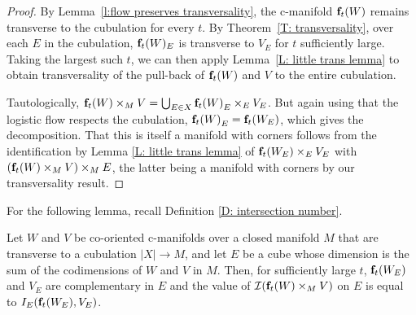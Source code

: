 \begin{proof}
	By Lemma~\ref{l:flow preserves transversality}, the c-manifold $\mathbf{f}_t(W)$ remains transverse to the cubulation for every $t$.
	By Theorem~\ref{T: transversality}, over each $E$ in the cubulation, $\mathbf{f}_t(W)_E$ is transverse to $V_E$ for $t$ sufficiently large. Taking the largest
	such $t$, we can then apply Lemma~\ref{L: little trans lemma} to obtain transversality of the pull-back of $\mathbf{f}_t(W)$ and $V$ to the entire cubulation.

	Tautologically, $ \mathbf{f}_t(W) \times_M V = \bigcup_{E \in X} {\mathbf{f}_t(W)}_E \times_E V_E$.
	But again using that the logistic flow respects the cubulation, ${\mathbf{f}_t(W)}_E = {\mathbf{f}_t(W_E)}$, which gives the decomposition.
	That this is itself a manifold with corners follows from the identification by Lemma \ref{L: little trans lemma} of $ {\mathbf{f}_t(W_E)} \times_E V_E$ with $(\mathbf{f}_t(W) \times_M V)\times_M E$, the latter being a manifold with corners by our transversality result.
\end{proof}

For the following lemma, recall Definition \ref{D: intersection number}.

\begin{lemma}\label{L: intersection signs}
	Let $W$ and $V$ be co-oriented c-manifolds over a closed manifold $M$ that are transverse to a cubulation $|X| \to M$, and let $E$ be a cube whose dimension
	is the sum of the codimensions of $W$ and $V$ in $M$. Then, for sufficiently large $t$, $\mathbf{f}_t(W_E)$ and $V_E$ are complementary in $E$ and the value of $\mathcal{I}(\mathbf{f}_t(W) \times_M V)$ on $E$
	is equal to $I_E(\mathbf{f}_t(W_E), V_E)$.
\end{lemma}


